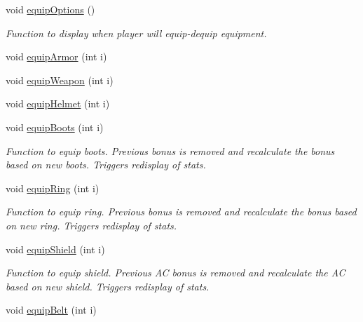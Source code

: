 \begin{DoxyCompactItemize}
void \hyperlink{class_fighter_a60976eb2c11504befe0aff8522339636}{equip\+Options} ()
\begin{DoxyCompactList}\small\item\em Function to display when player will equip-\/dequip equipment. \end{DoxyCompactList}\item 
void \hyperlink{class_fighter_acabd4955401ddf3ddc0be5f28fa64267}{equip\+Armor} (int i)
\item 
void \hyperlink{class_fighter_a4d88916d33514e2c7e5aaaef8916f93c}{equip\+Weapon} (int i)
\item 
void \hyperlink{class_fighter_ae90d7de8a4d6b61b35f43cefe7ec940c}{equip\+Helmet} (int i)
\item 
\hypertarget{class_fighter_aabfc72ac049b808fabbb77aa9fdfcba4}{}\label{class_fighter_aabfc72ac049b808fabbb77aa9fdfcba4} 
void \hyperlink{class_fighter_aabfc72ac049b808fabbb77aa9fdfcba4}{equip\+Boots} (int i)
\begin{DoxyCompactList}\small\item\em Function to equip boots. Previous bonus is removed and recalculate the bonus based on new boots. Triggers redisplay of stats. \end{DoxyCompactList}\item 
\hypertarget{class_fighter_a51cff2d6b9af41b0f6a2ca3a26b6eb42}{}\label{class_fighter_a51cff2d6b9af41b0f6a2ca3a26b6eb42} 
void \hyperlink{class_fighter_a51cff2d6b9af41b0f6a2ca3a26b6eb42}{equip\+Ring} (int i)
\begin{DoxyCompactList}\small\item\em Function to equip ring. Previous bonus is removed and recalculate the bonus based on new ring. Triggers redisplay of stats. \end{DoxyCompactList}\item 
\hypertarget{class_fighter_af314de4ade8520638065735f2ebd3fc8}{}\label{class_fighter_af314de4ade8520638065735f2ebd3fc8} 
void \hyperlink{class_fighter_af314de4ade8520638065735f2ebd3fc8}{equip\+Shield} (int i)
\begin{DoxyCompactList}\small\item\em Function to equip shield. Previous AC bonus is removed and recalculate the AC based on new shield. Triggers redisplay of stats. \end{DoxyCompactList}\item 
\hypertarget{class_fighter_aed08492ff6120638f476309a50887841}{}\label{class_fighter_aed08492ff6120638f476309a50887841} 
void \hyperlink{class_fighter_aed08492ff6120638f476309a50887841}{equip\+Belt} (int i)

\end{DoxyCompactItemize}
